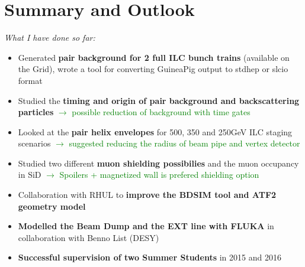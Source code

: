 \documentclass[xcolor={dvipsnames}]{beamer}
\begin{document}
\section{Summary and Outlook}
\begin{frame}
\textit{What I have done so far:}
 \begin{itemize} 
  \item Generated \textbf{pair background for 2 full ILC bunch trains} (available on the Grid), wrote a tool for converting GuineaPig output to stdhep or slcio format
  \item Studied the \textbf{timing and origin of pair background and backscattering particles} \textcolor{Green}{$\rightarrow$ possible reduction of background with time gates}
  \item Looked at the \textbf{pair helix envelopes} for 500, 350 and 250GeV ILC staging scenarios \textcolor{Green}{$\rightarrow$ suggested reducing the radius of beam pipe and vertex detector}
  \item Studied two different \textbf{muon shielding possibilies} and the muon occupancy in SiD \textcolor{Green}{$\rightarrow$ Spoilers + magnetized wall is prefered shielding option}
  \item Collaboration with RHUL to \textbf{improve the BDSIM tool and ATF2 geometry model}
  \item \textbf{Modelled the Beam Dump and the EXT line with FLUKA} in collaboration with Benno List (DESY)
  \item \textbf{Successful supervision of two Summer Students} in 2015 and 2016
 \end{itemize}
\end{frame}
\end{document}
